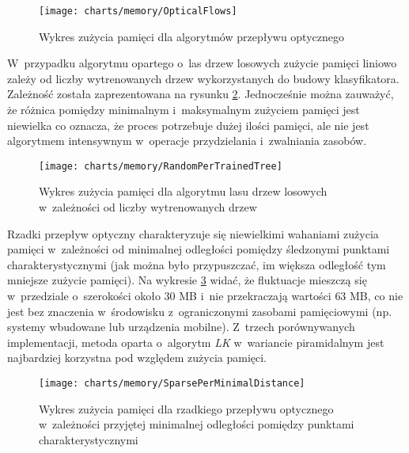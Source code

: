       \begin{figure}[!ht]
        \centering
        \texttt{[image: charts/memory/OpticalFlows]}
        \caption[Wykres zużycia pamięci dla algorytmów przepływu optycznego]
                {Wykres zużycia pamięci dla algorytmów przepływu optycznego}
        \label{fig:OpticalFlowsMemoryUsage}
      \end{figure}

    W~przypadku algorytmu opartego o~las drzew losowych zużycie pamięci liniowo zależy od liczby wytrenowanych drzew wykorzystanych do budowy klasyfikatora. Zależność została zaprezentowana na rysunku \ref{fig:RandomForestTrackerPerTrainedTreesAmount}. Jednocześnie można zauważyć, że różnica pomiędzy minimalnym i~maksymalnym zużyciem pamięci jest niewielka co oznacza, że proces potrzebuje dużej ilości pamięci, ale nie jest algorytmem intensywnym w~operacje przydzielania i~zwalniania zasobów.

      \begin{figure}[!ht]
        \centering
        \texttt{[image: charts/memory/RandomPerTrainedTree]}
        \caption[Wykres zużycia pamięci dla algorytmu lasu drzew losowych w~zależności od liczby wytrenowanych drzew]
                {Wykres zużycia pamięci dla algorytmu lasu drzew losowych w~zależności od liczby wytrenowanych drzew}
        \label{fig:RandomForestTrackerPerTrainedTreesAmount}
      \end{figure}

    Rzadki przepływ optyczny charakteryzuje się niewielkimi wahaniami zużycia pamięci w~zależności od minimalnej odległości pomiędzy śledzonymi punktami charakterystycznymi (jak można było przypuszczać, im większa odległość tym mniejsze zużycie pamięci). Na wykresie \ref{fig:SparseOpticalFlowPerMinimalDistanceBetweenPoints} widać, że fluktuacje mieszczą się w~przedziale o~szerokości około $30$ MB i~nie przekraczają wartości $63$ MB, co nie jest bez znaczenia w~środowisku z~ograniczonymi zasobami pamięciowymi (np. systemy wbudowane lub urządzenia mobilne). Z~trzech porównywanych implementacji, metoda oparta o~algorytm \textit{LK} w~wariancie piramidalnym jest najbardziej korzystna pod względem zużycia pamięci.

      \begin{figure}[!ht]
        \centering
        \texttt{[image: charts/memory/SparsePerMinimalDistance]}
        \caption[Wykres zużycia pamięci dla rzadkiego przepływu optycznego w~zależności przyjętej minimalnej odległości pomiędzy punktami charakterystycznymi]
                {Wykres zużycia pamięci dla rzadkiego przepływu optycznego w~zależności przyjętej minimalnej odległości pomiędzy punktami charakterystycznymi}
        \label{fig:SparseOpticalFlowPerMinimalDistanceBetweenPoints}
      \end{figure}

